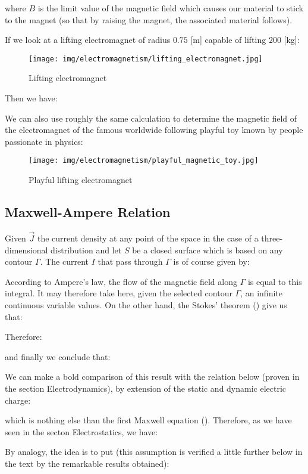 	where $B$ is the limit value of the magnetic field which causes our material to stick to the magnet (so that by raising the magnet, the associated material follows).
	
	If we look at a lifting electromagnet of radius $0.75$ [m] capable of lifting $200$ [kg]:
	\begin{figure}[H]
		\centering
		\texttt{[image: img/electromagnetism/lifting\_electromagnet.jpg]}
		\caption{Lifting electromagnet}
	\end{figure}
	Then we have:
	
	We can also use roughly the same calculation to determine the magnetic field of the electromagnet of the famous worldwide following playful toy known by people passionate in physics:
	\begin{figure}[H]
		\centering
		\texttt{[image: img/electromagnetism/playful\_magnetic\_toy.jpg]}
		\caption{Playful lifting electromagnet}
	\end{figure}
	
	\pagebreak
	\subsection{Maxwell-Ampere Relation}
	Given $\vec{J}$ the current density at any point of the space in the case of a three-dimensional distribution and let $S$ be a closed surface which is based on any contour $\Gamma$. The current $I$ that pass through $\Gamma$ is of course given by:
	
	According to Ampere's law, the flow of the magnetic field along $\Gamma$ is equal to this integral. It may therefore take here, given the selected contour $\Gamma$, an infinite continuous variable values. On the other hand, the Stokes' theorem () give us that:
	
	Therefore:
	
	and finally we conclude that:
	
	We can make a bold comparison of this result with the relation below (proven in the section Electrodynamics), by extension of the static and dynamic electric charge:
	
	which is nothing else than the first Maxwell equation (). Therefore, as we have seen in the secton Electrostatics, we have:
	
	By analogy, the idea is to put (this assumption is verified a little further below in the text by the remarkable results obtained):
	
